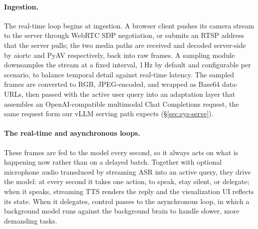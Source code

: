 \paragraph{\textbf{Ingestion.}} The real-time loop begins at ingestion. A browser client pushes its camera stream to the server through WebRTC SDP negotiation, or submits an RTSP address that the server pulls; the two media paths are received and decoded server-side by aiortc and PyAV respectively, back into raw frames. A sampling module downsamples the stream at a fixed interval, 1\,Hz by default and configurable per scenario, to balance temporal detail against real-time latency. The sampled frames are converted to RGB, JPEG-encoded, and wrapped as Base64 data-URLs, then passed with the active user query into an adaptation layer that assembles an OpenAI-compatible multimodal Chat Completions request, the same request form our vLLM serving path expects (§\ref{sec:sys-serve}).


\paragraph{\textbf{The real-time and asynchronous loops.}} These frames are fed to the model every second, so it always acts on what is happening now rather than on a delayed batch. Together with optional microphone audio transduced by streaming ASR into an active query, they drive the model: at every second it takes one action, to speak, stay silent, or delegate; when it speaks, streaming TTS renders the reply and the visualization UI reflects its state. When it delegates, control passes to the asynchronous loop, in which a background model runs against the background brain to handle slower, more demanding tasks.


